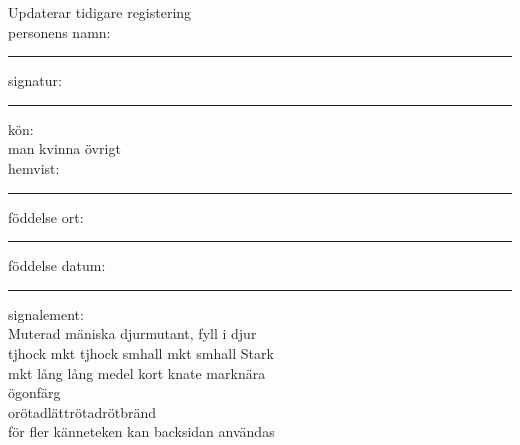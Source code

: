 \large
\Square Updaterar tidigare registering\\


personens namn:\\
\vspace*{1cm}
\hrule


signatur:\\
\vspace*{0.5cm}
\hrule
kön:\\
\Square man
\Square kvinna
\Square övrigt
\\
hemvist:\\
\vspace*{0.5cm}
\hrule
föddelse ort:\\
\vspace*{0.5cm}
\hrule
föddelse datum:\\
\vspace*{0.5cm}
\hrule

signalement:\\
\Square Muterad mäniska \hspace*{10pt}\Square djurmutant, fyll i djur \hrulefill\\
\Square tjhock \hspace*{5pt} \Square mkt tjhock \hspace*{5pt} \Square smhall \hspace*{5pt} \Square mkt smhall \hspace*{5pt} \Square Stark\\
\Square mkt lång \hspace*{3pt}\Square lång  \hspace*{3pt}\Square medel \hspace*{3pt}\Square kort \hspace*{3pt}\Square knate \hspace*{3pt}\Square marknära\\
\Square ögonfärg \hrulefill \\
\Square orötad\hspace*{3pt}\Square lättrötad\hspace*{3pt}\Square rötbränd\\
för fler känneteken kan backsidan användas\\